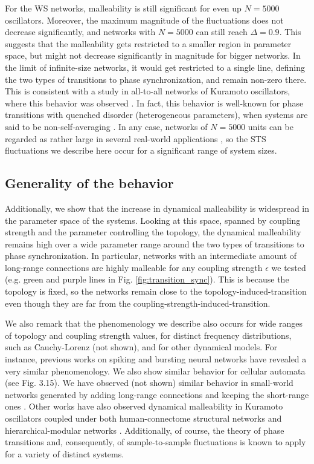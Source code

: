 For the WS networks, malleability is still significant for even up $N = 5000$ oscillators. Moreover, the maximum magnitude of the fluctuations does not decrease significantly, and networks with $N = 5000$ can still reach $\Delta = 0.9$. This suggests that the malleability gets restricted to a smaller region in parameter space, but might not decrease significantly in magnitude for bigger networks. In the limit of infinite-size networks, it would get restricted to a single line, defining the two types of transitions to phase synchronization, and remain non-zero there. This is consistent with a study in all-to-all networks of Kuramoto oscillators, where this behavior was observed \cite{hong2006anomalous}. In fact, this behavior is well-known for phase transitions with quenched disorder (heterogeneous parameters), when systems are said to be non-self-averaging \cite{wiseman1995lack}.  
In any case, networks of $N = 5000$ units can be regarded as rather large in several real-world applications \cite{peter2018transition}, so the STS fluctuations we describe here occur for a significant range of system sizes.

\subsection*{Generality of the behavior}
Additionally, we show that the increase in dynamical malleability is widespread in the parameter space of the systems. Looking at this space, spanned by coupling strength and the parameter controlling the topology, the dynamical malleability remains high over a wide parameter range around the two types of transitions to phase synchronization. In particular, networks with an intermediate amount of long-range connections are highly malleable for any coupling strength $\epsilon$ we tested (e.g. green and purple lines in Fig. \ref{fig:transition_sync}). This is because the topology is fixed, so the networks remain close to the topology-induced-transition even though they are far from the coupling-strength-induced-transition. 

We also remark that the phenomenology we describe also occurs for wide ranges of topology and coupling strength values, for distinct frequency distributions, such as Cauchy-Lorenz (not shown), and for other dynamical models. For instance, previous works on spiking \cite{budzinski2020synchronization} and bursting \cite{budzinski2019synchronous} neural networks have revealed a very similar phenomenology. We also show similar behavior for cellular automata (see Fig. 3.15). We have observed (not shown) similar behavior in small-world networks generated by adding long-range connections and keeping the short-range ones \cite{newman1999scaling}. Other works have also observed dynamical malleability in Kuramoto oscillators coupled under both human-connectome structural networks and hierarchical-modular networks \cite{buendia2022the, villegas2014frustrated}. 
Additionally, of course, the theory of phase transitions and, consequently, of sample-to-sample fluctuations is known to apply for a variety of distinct systems. 


